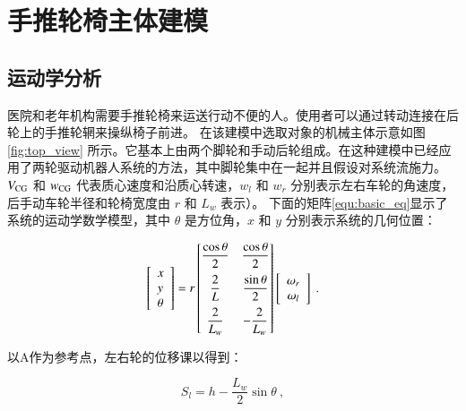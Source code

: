 \section{手推轮椅主体建模}

\subsection{运动学分析}

	医院和老年机构需要手推轮椅来运送行动不便的人。使用者可以通过转动连接在后轮上的手推轮辋来操纵椅子前进。
	在该建模中选取对象的机械主体示意如图 \ref{fig:top_view} 所示。它基本上由两个脚轮和手动后轮组成。在这种建模中已经应用了两轮驱动机器人系统的方法，其中脚轮集中在一起并且假设对系统流施力。 
	$ V_{\rm{CG}} $ 和 $ w_{\rm{CG}} $ 代表质心速度和沿质心转速，$ w_l $ 和 $ w_r $ 分别表示左右车轮的角速度，后手动车轮半径和轮椅宽度由 $ r $ 和 $ L_w $ 表示）。
	下面的矩阵\ref{equ:basic_eq}显示了系统的运动学数学模型，其中 $ \theta $ 是方位角，$ x $ 和 $ y $ 分别表示系统的几何位置：
	
	\begin{equation}
	\label{equ:basic_eq}
	\begin{bmatrix} \begin{array}{l}{x} \\ {y} \\ {\theta}\end{array} \end{bmatrix}
	=
	r
	\begin{bmatrix}
		\vspace{0.2cm} {\dfrac{\cos \theta}{2}} & {\dfrac{\cos \theta}{2}} \\
		\vspace{0.2cm} {\dfrac{2}{L}} & {\dfrac{\sin \theta}{2}} \\
		{\dfrac{2}{L_w}} & - {\dfrac{2}{L_w}}
	\end{bmatrix}
	\begin{bmatrix} \begin{array}{c}{\omega_r} \\ {\omega_l}\end{array} \end{bmatrix}
	\ .
	\end{equation}
	
	以A作为参考点，左右轮的位移课以得到： 
	
	\begin{equation}
	\label{equ:left_s}
	S_l = h
	-
	\frac{L_w}{2} \sin \theta
	\ ,
	\end{equation}
	
